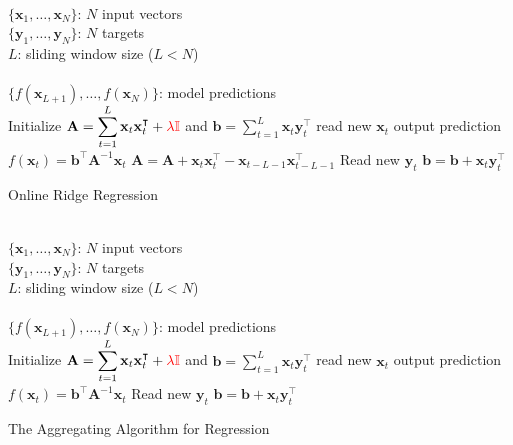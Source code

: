 \documentclass{beamer}
\begin{document}
\begin{frame}
\begin{algorithm}[H]
\begin{algorithmic}[1]
\REQUIRE $\,$ \\
$\{\mathbf{x}_1,\dots,\mathbf{x}_N \}$: $N$ input vectors \\
$\{\mathbf{y}_1,\dots,\mathbf{y}_N \}$: $N$ targets \\
$L$: sliding window size ($L<N$) \\
\ENSURE  $\,$ \\
$\{f(\mathbf{x}_{L+1}),\dots,f(\mathbf{x}_N) \}$: model predictions \\
\STATE Initialize $\mathbf{A}=\displaystyle \sum_{t=1}^L \mathbf{x}_t
\mathbf{x}_t^\intercal + {\color{red}\lambda \mathbb{I}}$
and $\mathbf{b}=\displaystyle \sum_{t=1}^L \mathbf{x}_t \mathbf{y}^\intercal_{t}$
        \STATE read new $\mathbf{x}_t$
        \STATE output prediction $f(\mathbf{x}_t) =  \mathbf{b}^\intercal
\mathbf{A}^{-1}\mathbf{x}_t$
\STATE $\mathbf{A} = \mathbf{A} + \mathbf{x}_t \mathbf{x}_t^\intercal-
\mathbf{x}_{t-L-1} \mathbf{x}_{t-L-1}^\intercal  $
        \STATE Read new $\mathbf{y}_t$
        \STATE $\mathbf{b} = \mathbf{b} + \mathbf{x}_t \mathbf{y}^\intercal_{t}$
\ENDFOR
\end{algorithmic}
\caption{Online Ridge Regression}
\label{alg:SLAAR}
\end{algorithm}
\end{frame}


\begin{frame}
\begin{algorithm}[H]
\begin{algorithmic}[1]
\REQUIRE $\,$ \\
$\{\mathbf{x}_1,\dots,\mathbf{x}_N \}$: $N$ input vectors \\
$\{\mathbf{y}_1,\dots,\mathbf{y}_N \}$: $N$ targets \\
$L$: sliding window size ($L<N$) \\
\ENSURE  $\,$ \\
$\{f(\mathbf{x}_{L+1}),\dots,f(\mathbf{x}_N) \}$: model predictions \\
\STATE Initialize $\mathbf{A}=\displaystyle \sum_{t=1}^L \mathbf{x}_t
\mathbf{x}_t^\intercal + {\color{red}\lambda \mathbb{I}}$
and $\mathbf{b}=\displaystyle \sum_{t=1}^L \mathbf{x}_t \mathbf{y}^\intercal_{t}$
        \STATE read new $\mathbf{x}_t$
        \STATE output prediction $f(\mathbf{x}_t) =  \mathbf{b}^\intercal
\mathbf{A}^{-1}\mathbf{x}_t$
        \STATE Read new $\mathbf{y}_t$
        \STATE $\mathbf{b} = \mathbf{b} + \mathbf{x}_t \mathbf{y}^\intercal_{t}$
\ENDFOR
\end{algorithmic}
\caption{The Aggregating Algorithm for Regression}
\label{alg:SLAAR}
\end{algorithm}
\end{frame}
\end{document}
